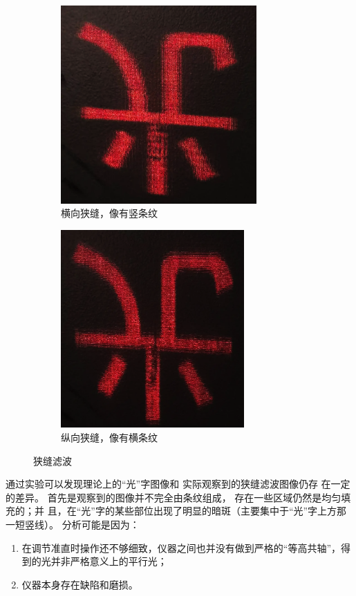 \documentclass[UTF8]{article}
\theoremstyle{MyLineTheoremStyle} %
\theoremstyle{MyBlockTheoremStyle} %
\theoremstyle{MySubsubsectionStyle} %
\begin{document}
\begin{figure}[H]\centering
\begin{subfigure}[b]{0.5\columnwidth}\centering
    \includegraphics[height=215pt]{assets/1 阿贝尔/光 横向狭缝.png}
    \caption{横向狭缝，像有竖条纹}
\end{subfigure}\hfill
\begin{subfigure}[b]{0.5\columnwidth}\centering
    \includegraphics[height=215pt]{assets/1 阿贝尔/光 纵向狭缝.png}
    \caption{纵向狭缝，像有横条纹}
\end{subfigure}
\caption{狭缝滤波}\label{狭缝滤波}
\end{figure}


通过实验可以发现理论上的“光”字图像和
实际观察到的狭缝滤波图像仍存
在一定的差异。
首先是观察到的图像并不完全由条纹组成，
存在一些区域仍然是均匀填充的；并
且，在“光”字的某些部位出现了明显的暗斑（主要集中于“光”字上方那一短竖线）。
分析可能是因为：
\begin{enumerate}
\item 在调节准直时操作还不够细致，仪器之间也并没有做到严格的“等高共轴”，得到的光并非严格意义上的平行光；
\item 仪器本身存在缺陷和磨损。
\end{enumerate}
\end{document}
